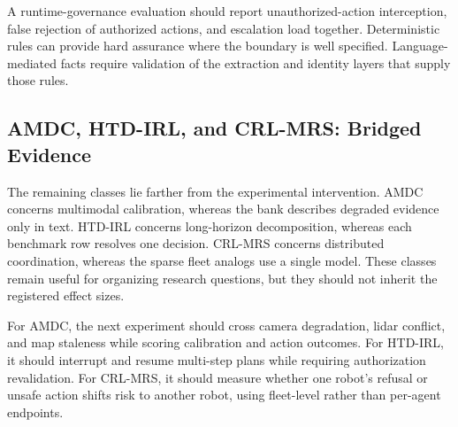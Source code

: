 \documentclass[conference]{IEEEtran}
\begin{document}
A runtime-governance evaluation should report unauthorized-action interception, false rejection of authorized actions, and escalation load together. Deterministic rules can provide hard assurance where the boundary is well specified. Language-mediated facts require validation of the extraction and identity layers that supply those rules.

\subsection{AMDC, HTD-IRL, and CRL-MRS: Bridged Evidence}

The remaining classes lie farther from the experimental intervention. AMDC concerns multimodal calibration, whereas the bank describes degraded evidence only in text. HTD-IRL concerns long-horizon decomposition, whereas each benchmark row resolves one decision. CRL-MRS concerns distributed coordination, whereas the sparse fleet analogs use a single model. These classes remain useful for organizing research questions, but they should not inherit the registered effect sizes.

For AMDC, the next experiment should cross camera degradation, lidar conflict, and map staleness while scoring calibration and action outcomes. For HTD-IRL, it should interrupt and resume multi-step plans while requiring authorization revalidation. For CRL-MRS, it should measure whether one robot's refusal or unsafe action shifts risk to another robot, using fleet-level rather than per-agent endpoints.
\end{document}
